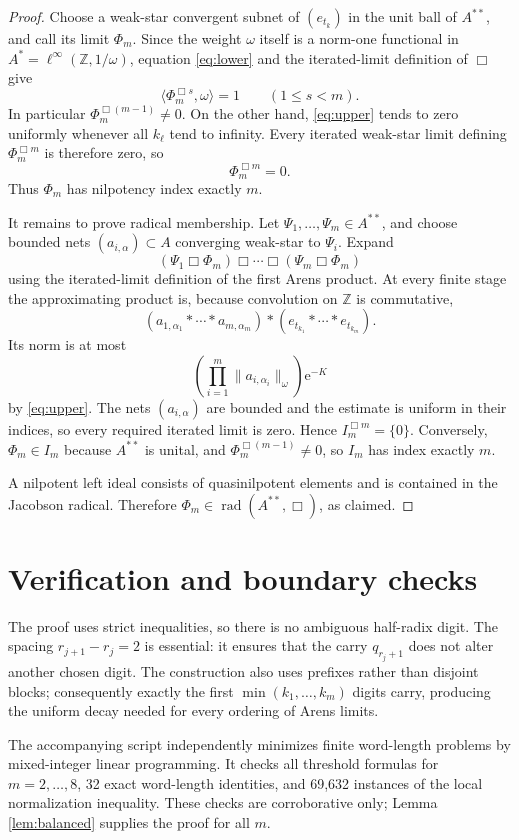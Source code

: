 \documentclass[11pt]{article}
\newcommand{\Z}{\mathbb Z}
\newcommand{\rad}{\operatorname{rad}}
\newcommand{\ee}{\mathrm e}
\begin{document}
\begin{proof}
Choose a weak-star convergent subnet of \((e_{t_k})\) in the unit ball of
\(A^{**}\), and call its limit \(\Phi_m\).  Since the weight \(\omega\)
itself is a norm-one functional in
\(A^*=\ell^\infty(\Z,1/\omega)\), equation \eqref{eq:lower} and the
iterated-limit definition of \(\Box\) give
\[
 \langle\Phi_m^{\Box s},\omega\rangle=1
 \qquad(1\leq s<m).
\]
In particular \(\Phi_m^{\Box(m-1)}\neq0\).  On the other hand,
\eqref{eq:upper} tends to zero uniformly whenever all \(k_\ell\) tend to
infinity.  Every iterated weak-star limit defining
\(\Phi_m^{\Box m}\) is therefore zero, so
\[
 \Phi_m^{\Box m}=0.
\]
Thus \(\Phi_m\) has nilpotency index exactly \(m\).

It remains to prove radical membership.  Let
\(\Psi_1,\ldots,\Psi_m\in A^{**}\), and choose bounded nets
\((a_{i,\alpha})\subset A\) converging weak-star to \(\Psi_i\).  Expand
\[
 (\Psi_1\Box\Phi_m)\Box\cdots\Box
 (\Psi_m\Box\Phi_m)
\]
using the iterated-limit definition of the first Arens product.  At every
finite stage the approximating product is, because convolution on \(\Z\)
is commutative,
\[
 (a_{1,\alpha_1}*\cdots*a_{m,\alpha_m})*
 (e_{t_{k_1}}*\cdots*e_{t_{k_m}}).
\]
Its norm is at most
\[
 \left(\prod_{i=1}^m\|a_{i,\alpha_i}\|_\omega\right)\ee^{-K}
\]
by \eqref{eq:upper}.  The nets \((a_{i,\alpha})\) are bounded and the
estimate is uniform in their indices, so every required iterated limit is
zero.  Hence \(I_m^{\Box m}=\{0\}\).  Conversely,
\(\Phi_m\in I_m\) because \(A^{**}\) is unital, and
\(\Phi_m^{\Box(m-1)}\neq0\), so \(I_m\) has index exactly \(m\).

A nilpotent left ideal consists of quasinilpotent elements and is contained
in the Jacobson radical.  Therefore \(\Phi_m\in\rad(A^{**},\Box)\), as
claimed.
\end{proof}

\section{Verification and boundary checks}

The proof uses strict inequalities, so there is no ambiguous half-radix
digit.  The spacing \(r_{j+1}-r_j=2\) is essential: it ensures that the
carry \(q_{r_j+1}\) does not alter another chosen digit.  The construction
also uses prefixes rather than disjoint blocks; consequently exactly the
first \(\min(k_1,\ldots,k_m)\) digits carry, producing the uniform decay
needed for every ordering of Arens limits.

The accompanying script independently minimizes finite word-length problems
by mixed-integer linear programming.  It checks all threshold formulas for
\(m=2,\ldots,8\), 32 exact word-length identities, and 69,632 instances of
the local normalization inequality.  These checks are corroborative only;
Lemma \ref{lem:balanced} supplies the proof for all \(m\).
\end{document}

